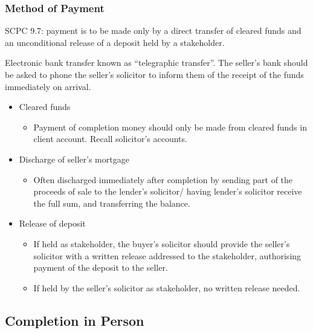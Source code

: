 \documentclass[
]{article}
\providecommand{\tightlist}{%
  \setlength{\itemsep}{0pt}\setlength{\parskip}{0pt}}
\begin{document}
\hypertarget{method-of-payment}{%
\subsubsection{Method of Payment}\label{method-of-payment}}

SCPC 9.7: payment is to be made only by a direct transfer of cleared
funds and an unconditional release of a deposit held by a stakeholder.

Electronic bank transfer known as ``telegraphic transfer''. The seller's
bank should be asked to phone the seller's solicitor to inform them of
the receipt of the funds immediately on arrival.

\begin{itemize}
\tightlist
\item
  Cleared funds

  \begin{itemize}
  \tightlist
  \item
    Payment of completion money should only be made from cleared funds
    in client account. Recall solicitor's accounts.
  \end{itemize}
\item
  Discharge of seller's mortgage

  \begin{itemize}
  \tightlist
  \item
    Often discharged immediately after completion by sending part of the
    proceeds of sale to the lender's solicitor/ having lender's
    solicitor receive the full sum, and transferring the balance.
  \end{itemize}
\item
  Release of deposit

  \begin{itemize}
  \tightlist
  \item
    If held as stakeholder, the buyer's solicitor should provide the
    seller's solicitor with a written release addressed to the
    stakeholder, authorising payment of the deposit to the seller.
  \item
    If held by the seller's solicitor as stakeholder, no written release
    needed.
  \end{itemize}
\end{itemize}

\hypertarget{completion-in-person}{%
\subsection{Completion in Person}\label{completion-in-person}}
\end{document}
